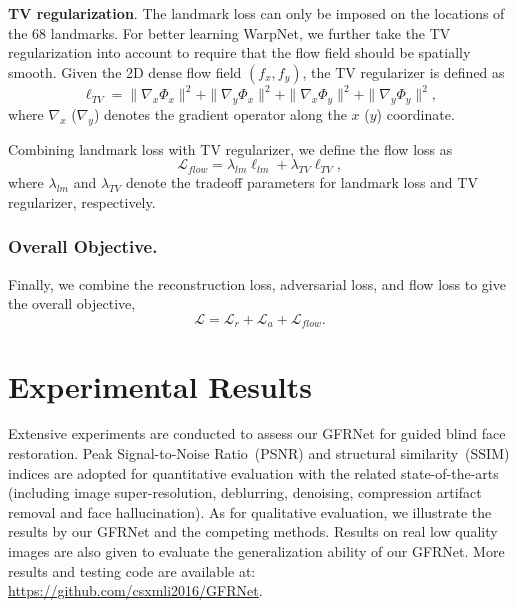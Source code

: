 \documentclass[runningheads]{llncs}
\begin{document}
\textbf{TV regularization}.
The landmark loss can only be imposed on the locations of the 68 landmarks.
For better learning WarpNet, we further take the TV regularization into account to require that the flow field should be spatially smooth.
Given the 2D dense flow field $(f_x, f_y)$, the TV regularizer is defined as
\begin{equation}\label{eqn:tv}
\ell_{TV} = \|\nabla_x \Phi_x\|^2 + \|\nabla_y \Phi_x \|^2 + \|\nabla_x \Phi_y \|^2 + \|\nabla_y \Phi_y \|^2,
\end{equation}
where $\nabla_x$ ($\nabla_y$) denotes the gradient operator along the $x$ ($y$) coordinate.


Combining landmark loss with TV regularizer, we define the flow loss as
\begin{equation}\label{eqn:tv}
\mathcal{L}_{flow} = \lambda_{lm} \ell_{lm} + \lambda_{TV} \ell_{TV},
\end{equation}
where $\lambda_{lm}$ and $\lambda_{TV}$ denote the tradeoff parameters for landmark loss  and TV regularizer, respectively.
\subsubsection{Overall Objective.}
Finally, we combine the reconstruction loss, adversarial loss, and flow loss to give the overall objective,
\begin{equation}\label{eqn:objective}
\mathcal{L} = \mathcal{L}_{r} + \mathcal{L}_{a} + \mathcal{L}_{flow}.
\end{equation}
\section{Experimental Results}\label{section4}
Extensive experiments are conducted to assess our GFRNet for guided blind face restoration.
Peak Signal-to-Noise Ratio~(PSNR) and structural similarity~(SSIM) indices are adopted for quantitative evaluation with the related state-of-the-arts (including image super-resolution, deblurring, {denoising, compression artifact removal} and face hallucination).
As for qualitative evaluation, we illustrate the results by our GFRNet and the competing methods.
Results on real low quality images are also given to evaluate the generalization ability of our GFRNet.
More results and testing code are available at: \url{https://github.com/csxmli2016/GFRNet}.
\end{document}
